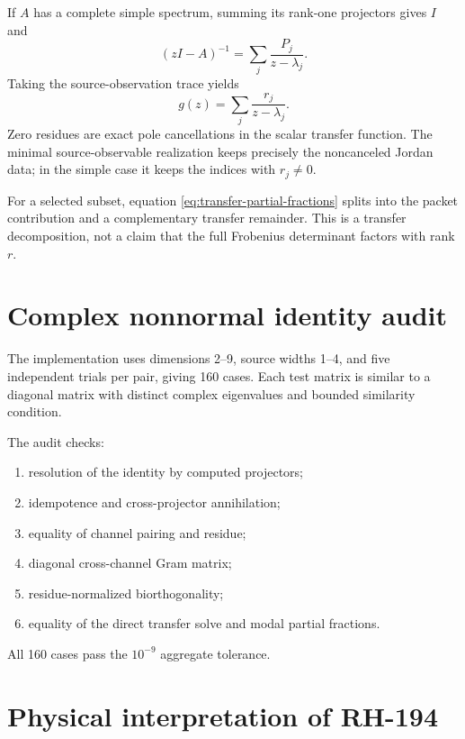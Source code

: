\documentclass[12pt]{article}
\theoremstyle{remark}
\begin{document}
If $A$ has a complete simple spectrum, summing its rank-one projectors gives
$I$ and
\begin{equation}\label{eq:resolvent-partial-fractions}
 (zI-A)^{-1}=\sum_j\frac{P_j}{z-\lambda_j}.
\end{equation}
Taking the source-observation trace yields
\begin{equation}\label{eq:transfer-partial-fractions}
 \boxed{g(z)=\sum_j\frac{r_j}{z-\lambda_j}.}
\end{equation}
Zero residues are exact pole cancellations in the scalar transfer function.
The minimal source-observable realization keeps precisely the noncanceled
Jordan data; in the simple case it keeps the indices with $r_j\ne0$.

For a selected subset, equation \eqref{eq:transfer-partial-fractions}
splits into the packet contribution and a complementary transfer remainder.
This is a transfer decomposition, not a claim that the full Frobenius
determinant factors with rank $r$.

\section{Complex nonnormal identity audit}

The implementation uses dimensions 2--9, source widths 1--4, and five
independent trials per pair, giving 160 cases.  Each test matrix is similar
to a diagonal matrix with distinct complex eigenvalues and bounded
similarity condition.

The audit checks:
\begin{enumerate}[leftmargin=2em]
\item resolution of the identity by computed projectors;
\item idempotence and cross-projector annihilation;
\item equality of channel pairing and residue;
\item diagonal cross-channel Gram matrix;
\item residue-normalized biorthogonality;
\item equality of the direct transfer solve and modal partial fractions.
\end{enumerate}
All 160 cases pass the $10^{-9}$ aggregate tolerance.

\section{Physical interpretation of RH-194}
\end{document}
